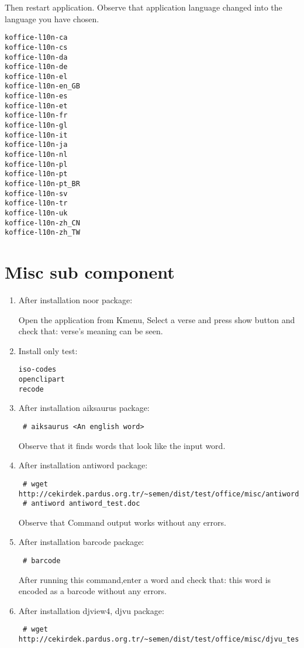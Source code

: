 \documentclass[a4paper,10pt]{article}
\begin{document}
Then restart application. Observe that application language changed into the language you have chosen.

\begin{verbatim}
koffice-l10n-ca
koffice-l10n-cs
koffice-l10n-da
koffice-l10n-de
koffice-l10n-el
koffice-l10n-en_GB
koffice-l10n-es
koffice-l10n-et
koffice-l10n-fr
koffice-l10n-gl
koffice-l10n-it
koffice-l10n-ja
koffice-l10n-nl
koffice-l10n-pl
koffice-l10n-pt
koffice-l10n-pt_BR
koffice-l10n-sv
koffice-l10n-tr
koffice-l10n-uk
koffice-l10n-zh_CN
koffice-l10n-zh_TW
\end{verbatim}

\section{Misc sub component}
\begin{enumerate}
\item After installation noor package:

Open the application from Kmenu, Select a verse and press show button and check that: verse's meaning can be seen.
\item Install only test:
\begin{verbatim}
iso-codes
openclipart
recode

\end{verbatim}
\item After installation aiksaurus package:
\begin{verbatim}
 # aiksaurus <An english word>
\end{verbatim}

Observe that it finds words that look like the input word.

\item After installation antiword package:
\begin{verbatim}
 # wget http://cekirdek.pardus.org.tr/~semen/dist/test/office/misc/antiword_test.doc
 # antiword antiword_test.doc
\end{verbatim}

Observe that Command output works without any errors.

\item After installation barcode package:
\begin{verbatim}
 # barcode
\end{verbatim}
 After running this command,enter a word and check that: this word is encoded as a barcode without any errors.

\item After installation djview4, djvu package:
\begin{verbatim}
 # wget http://cekirdek.pardus.org.tr/~semen/dist/test/office/misc/djvu_test.djvu
\end{verbatim}


\end{enumerate}
\end{document}
